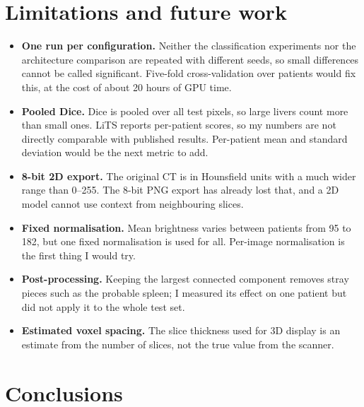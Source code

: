 \documentclass[11pt,a4paper]{article}
\begin{document}
\section{Limitations and future work}\label{sec:lim}

\begin{itemize}
  \item \textbf{One run per configuration.} Neither the classification experiments
        nor the architecture comparison are repeated with different seeds, so small
        differences cannot be called significant. Five-fold cross-validation over
        patients would fix this, at the cost of about 20 hours of GPU time.
  \item \textbf{Pooled Dice.} Dice is pooled over all test pixels, so large livers
        count more than small ones. LiTS reports per-patient scores, so my numbers
        are not directly comparable with published results. Per-patient mean and
        standard deviation would be the next metric to add.
  \item \textbf{8-bit 2D export.} The original CT is in Hounsfield units with a much
        wider range than 0--255. The 8-bit PNG export has already lost that, and a
        2D model cannot use context from neighbouring slices.
  \item \textbf{Fixed normalisation.} Mean brightness varies between patients from
        95 to 182, but one fixed normalisation is used for all. Per-image
        normalisation is the first thing I would try.
  \item \textbf{Post-processing.} Keeping the largest connected component removes
        stray pieces such as the probable spleen; I measured its effect on one
        patient but did not apply it to the whole test set.
  \item \textbf{Estimated voxel spacing.} The slice thickness used for 3D display is
        an estimate from the number of slices, not the true value from the scanner.
\end{itemize}

\section{Conclusions}
\end{document}
